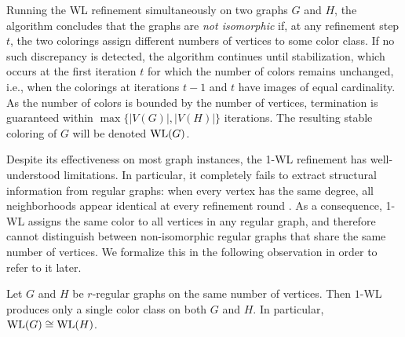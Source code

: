 Running the WL refinement simultaneously on two graphs $G$ and $H$, the algorithm concludes that the graphs are \emph{not isomorphic} if, at any refinement step $t$, the two colorings assign different numbers of vertices to some color class. 
If no such discrepancy is detected, the algorithm continues until stabilization, which occurs at the first iteration $t$ for which the number of colors remains unchanged, i.e., when the colorings at iterations $t-1$ and $t$ have images of equal cardinality. As the number of colors is bounded by the number of vertices, termination is guaranteed within $\max\{|V(G)|,|V(H)|\}$ iterations. The resulting stable coloring of $G$ will be denoted $\mathrm{WL}(G)$.

Despite its effectiveness on most graph instances, the 1-WL refinement has well-understood
limitations. In particular, it completely fails to extract structural information from regular
graphs: when every vertex has the same degree, all neighborhoods appear identical at every
refinement round \citep{WeisfeilerLehmanMethod,LowerBoundGraphIdentification}. As a consequence, 1-WL assigns the same color to all vertices in any
regular graph, and therefore cannot distinguish between non-isomorphic regular graphs that
share the same number of vertices. We formalize this in the following observation in order to refer to it later.


\begin{observation}
\label{obs:WL-regular-undistinguished}
Let $G$ and $H$ be $r$-regular graphs on the same number of vertices.
Then $1$-WL produces only a single color class on both $G$ and $H$.
In particular, $\mathrm{WL}(G) \cong \mathrm{WL}(H)$.
\end{observation}






